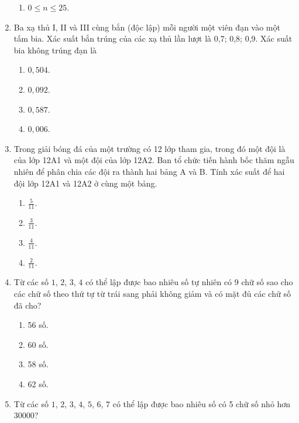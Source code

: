 \begin{enumerate}[label=\textbf{Câu \arabic*.},align=left,left=0cm..0cm,itemindent=*]
\begin{enumerate}[label=\textbf{\Alph*.},align=left,left=1cm..0cm,itemindent=*]
		\item $0\leqslant n\leqslant 25$.
	\end{enumerate}
	\item Ba xạ thủ I, II và III cùng bắn (độc lập) mỗi người một viên đạn vào một tấm bia. Xác suất bắn trúng của các xạ thủ lần lượt là 0,7; 0,8; 0,9. Xác suất bia không trúng đạn là
	\begin{multicols}{4}\begin{enumerate}[label=\textbf{\Alph*.},align=left,left=1cm..0cm,itemindent=*]
		\item $0,504$. \item $0,092$. \item $0,587$. \item $0,006$.
	\end{enumerate}\end{multicols}
	\item Trong giải bóng đá của một trường có 12 lớp tham gia, trong đó một đội là của lớp 12A1 và một đội của lớp 12A2. Ban tổ chức tiến hành bốc thăm ngẫu nhiên để phân chia các đội ra thành hai bảng A và B. Tính xác suất để hai đội lớp 12A1 và 12A2 ở cùng một bảng.
	\begin{multicols}{4}\begin{enumerate}[label=\textbf{\Alph*.},align=left,left=1cm..0cm,itemindent=*]
		\item $\frac{5}{11}$. \item $\frac{3}{11}$. \item $\frac{4}{11}$. \item $\frac{2}{11}$.
	\end{enumerate}\end{multicols}
	\item Từ các số $1$, $2$, $3$, $4$ có thể lập được bao nhiêu số tự nhiên có 9 chữ số sao cho các chữ số theo thứ tự từ trái sang phải không giảm và có mặt đủ các chữ số đã cho?
	\begin{multicols}{4}\begin{enumerate}[label=\textbf{\Alph*.},align=left,left=1cm..0cm,itemindent=*]
		\item 56 số. \item 60 số. \item 58 số. \item 62 số.
	\end{enumerate}\end{multicols}
	\item Từ các số $1$, $2$, $3$, $4$, $5$, $6$, $7$ có thể lập được bao nhiêu số có 5 chữ số nhỏ hơn $30000$?
	\begin{multicols}{4}\begin{enumerate}[label=\textbf{\Alph*.},align=left,left=1cm..0cm,itemindent=*]

\end{enumerate}
\end{multicols}
\end{enumerate}

